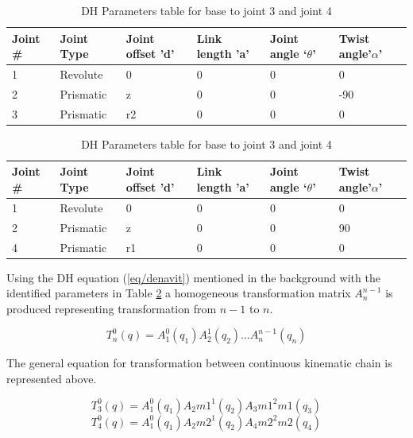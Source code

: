 \documentclass{UoNMCHA}
\numberwithin{equation}{section}
\begin{document}
	\begin{table}[H] \centering 
		\caption{DH Parameters table for base to joint 3 and joint 4}
		\begin{tabular}{llllll}
			\hline
			Joint \# & Joint Type & Joint offset 'd' & Link length 'a' & Joint angle ‘$\theta$’ & Twist angle'$\alpha$' \\ \hline
			1        & Revolute   & 0                & 0               & 0               & 0              \\
			2        & Prismatic  & z                & 0               & 0              & -90            \\
			3        & Prismatic  & r2               & 0               & 0               & 0             
		\end{tabular} \vspace{5mm}
		
		\begin{tabular}{llllll}
			\hline
			Joint \# & Joint Type & Joint offset 'd' & Link length 'a' & Joint angle ‘$\theta$’ & Twist angle'$\alpha$' \\ \hline
			1        & Revolute   & 0                & 0               & 0               & 0              \\
			2        & Prismatic  & z                & 0               & 0              & 90            \\
			4        & Prismatic  & r1               & 0               & 0               & 0             
		\end{tabular}
		\label{tab/joints}
	\end{table}
	
	
	Using the DH equation (\ref{eq/denavit}) mentioned in the background with the identified parameters in Table \ref{tab/joints} a homogeneous transformation matrix $A_{n}^{n-1}$ is produced representing transformation from $n-1$ to $n$. 
	
	\begin{equation}
	T_n^0 (q)=A_1^0 (q_1 ) A_2^1 (q_2 ) \dots A_{n}^{n-1} (q_n )
	\end{equation}
	
	The general equation for transformation between continuous kinematic chain is represented above.
	
	\begin{equation}
	T_3^0 (q)=A_1^0 (q_1 ) A_2m1^1 (q_2 ) A_3m1^2m1 (q_3 )
	\end{equation}
	\begin{equation}
	T_4^0 (q)=A_1^0 (q_1 ) A_2m2^1 (q_2 ) A_4m2^2m2 (q_4 )
	\end{equation}
	
\end{document}
